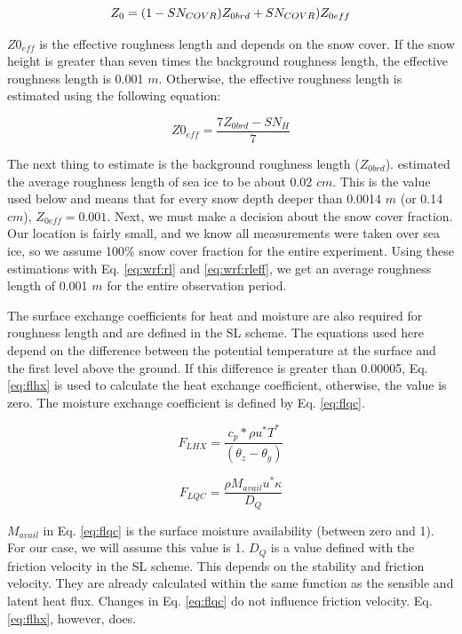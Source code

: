 {\begin{equation}\label{eq:wrf:rl}
Z_{0} = (1 - SN_{COVR}) Z_{0brd} + SN_{COVR}) \space Z_{0eff}
\end{equation}

$Z0_{eff}$ is the effective roughness length and depends on the snow cover. If the snow height is greater than seven times the background roughness length, the effective roughness length is 0.001 $m$. Otherwise, the effective roughness length is estimated using the following equation:

\begin{equation}\label{eq:wrf:rleff}
Z0_{eff} = \frac{7Z_{0brd}-SN_{H}}{7}
\end{equation}

The next thing to estimate is the background roughness length ($Z_{0brd}$). \citet{untersteiner:1965} estimated the average roughness length of sea ice to be about 0.02 $cm$. This is the value used below and means that for every snow depth deeper than 0.0014 $m$ (or 0.14 $cm$), $Z_{0eff} = 0.001$. Next, we must make a decision about the snow cover fraction. Our location is fairly small, and we know all measurements were taken over sea ice, so we assume 100$\%$ snow cover fraction for the entire experiment. Using these estimations with Eq. \ref{eq:wrf:rl} and \ref{eq:wrf:rleff}, we get an average roughness length of 0.001 $m$ for the entire observation period. 


The surface exchange coefficients for heat and moisture are also required for roughness length and are defined in the SL scheme. The equations used here depend on the difference between the potential temperature at the surface and the first level above the ground. If this difference is greater than 0.00005, Eq. \ref{eq:flhx} is used to calculate the heat exchange coefficient, otherwise, the value is zero. The moisture exchange coefficient is defined by Eq. \ref{eq:flqc}. 

\begin{equation}\label{eq:flhx}
F_{LHX} = \frac{c_{p} * \rho u^{*} T^{*}}{(\theta_{z} - \theta_{g})}
\end{equation}

\begin{equation}\label{eq:flqc}
F_{LQC} = \frac{\rho M_{avail} u^{*} \kappa}{D_{Q}}
\end{equation}

$M_{avail}$ in Eq. \ref{eq:flqc} is the surface moisture availability (between zero and 1). For our case, we will assume this value is 1. $D_{Q}$ is a value defined with the friction velocity in the SL scheme. This depends on the stability and friction velocity. They are already calculated within the same function as the sensible and latent heat flux. Changes in Eq. \ref{eq:flqc} do not influence friction velocity. Eq. \ref{eq:flhx}, however, does.

}
